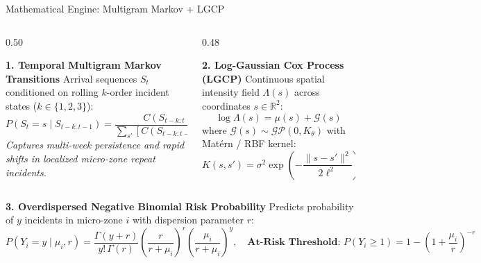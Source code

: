 \documentclass[aspectratio=169,10pt]{beamer}
\begin{document}
\begin{frame}{Mathematical Engine: Multigram Markov + LGCP}
  \begin{columns}[T]
    \begin{column}{0.50\textwidth}
      \begin{block}{\textbf{1. Temporal Multigram Markov Transitions}}
        \footnotesize
        Arrival sequences $S_t$ conditioned on rolling $k$-order incident states ($k \in \{1, 2, 3\}$):
        \begin{equation*}
          P(S_t = s \mid S_{t-k:t-1}) = \frac{C(S_{t-k:t}) + \alpha}{\sum_{s'} [C(S_{t-k:t-1}, s') + \alpha]}
        \end{equation*}
        \textit{Captures multi-week persistence and rapid shifts in localized micro-zone repeat incidents.}
      \end{block}
    \end{column}

    \begin{column}{0.48\textwidth}
      \begin{block}{\textbf{2. Log-Gaussian Cox Process (LGCP)}}
        \footnotesize
        Continuous spatial intensity field $\Lambda(s)$ across coordinates $s \in \mathbb{R}^2$:
        \begin{equation*}
          \log \Lambda(s) = \mu(s) + \mathcal{G}(s)
        \end{equation*}
        where $\mathcal{G}(s) \sim \mathcal{GP}(0, K_\theta)$ with Mat\'ern / RBF kernel:
        \begin{equation*}
          K(s, s') = \sigma^2 \exp\left(-\frac{\|s - s'\|^2}{2\ell^2}\right)
        \end{equation*}
      \end{block}
    \end{column}
  \end{columns}

  \vspace{0.2cm}
  \begin{block}{\textbf{3. Overdispersed Negative Binomial Risk Probability}}
    \footnotesize
    Predicts probability of $y$ incidents in micro-zone $i$ with dispersion parameter $r$:
    \begin{equation*}
      P(Y_i = y \mid \mu_i, r) = \frac{\Gamma(y + r)}{y! \, \Gamma(r)} \left(\frac{r}{r + \mu_i}\right)^r \left(\frac{\mu_i}{r + \mu_i}\right)^y, \quad \textbf{At-Risk Threshold: } P(Y_i \ge 1) = 1 - \left(1 + \frac{\mu_i}{r}\right)^{-r}
    \end{equation*}
  \end{block}
\end{frame}
\end{document}
